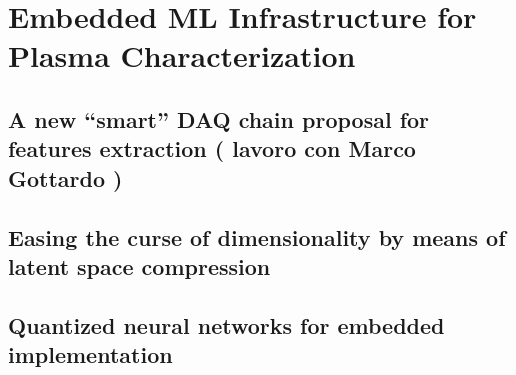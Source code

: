 \chapter{Embedded ML Infrastructure for Plasma Characterization}


\section{A new “smart” DAQ chain proposal for features extraction ( lavoro con Marco Gottardo )}


\section{Easing the curse of dimensionality by means of latent space compression}

\section{Quantized neural networks for embedded implementation}
